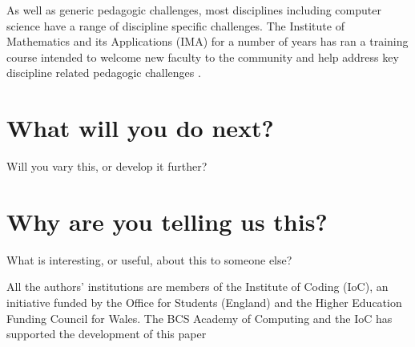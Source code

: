 \documentclass[sigconf]{acmart}
\begin{document}
As well as generic pedagogic challenges, most disciplines including computer science have a range of discipline specific challenges. The Institute of Mathematics and its Applications (IMA) for a number of years has ran a training course intended to welcome new faculty to the community and help address key discipline related pedagogic challenges \cite{IMA}.

\section{What will you do next?}
Will you vary this, or develop it further?
\section{Why are you telling us this?}	
What is interesting, or useful, about this to someone else?



\begin{acks}
 
  All the authors' institutions are members of the Institute of Coding (IoC), an initiative funded by the Office for Students (England) and the Higher Education Funding Council for Wales. The BCS Academy of Computing and the IoC has supported the development of this paper
 

\end{acks}





\balance
\end{document}
